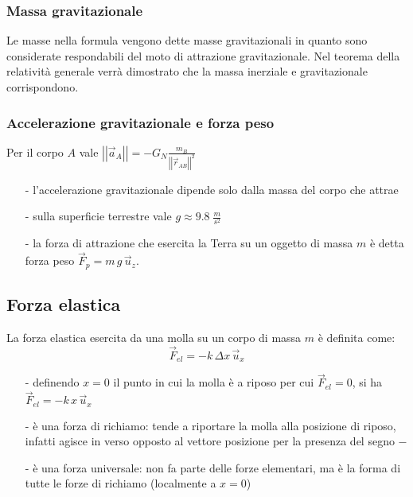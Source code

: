 \documentclass[a4paper]{article}
\newcommand\ux{\vec{u}_x}
\newcommand\uz{\vec{u}_z}
\newcommand\vmod[1]{\left|\left|{#1}\right|\right|}
\begin{document}
\subsubsection*{Massa gravitazionale}
Le masse nella formula vengono dette masse gravitazionali in quanto sono considerate respondabili del moto di attrazione gravitazionale.
Nel teorema della relatività generale verrà dimostrato che la massa inerziale e gravitazionale corrispondono.

\subsubsection*{Accelerazione gravitazionale e forza peso}
Per il corpo \(A\) vale \(\displaystyle \vmod{\vec{a}_A} = -G_N \frac{m_B}{\vmod{\vec{r}_{AB}}^2}\)

\begin{itemize}[topsep=3pt, itemsep=0pt]
	\item[-] l'accelerazione gravitazionale dipende solo dalla massa del corpo che attrae
	\item[-] sulla superficie terrestre vale \(\displaystyle g \approx 9.8 \; \frac{m}{s^2}\)
	\item[-] la forza di attrazione che esercita la Terra su un oggetto di massa \(m\) è detta forza peso \(\vec{F}_p = m \, g \, \uz\).
\end{itemize}

\subsection{Forza elastica}
La forza elastica esercita da una molla su un corpo di massa \(m\) è definita come:
\[\vec{F}_{el} = -k \, \Delta x \, \ux\]
\begin{itemize}[topsep=3pt, itemsep=0pt]
	\item[-] definendo \(x=0\) il punto in cui la molla è a riposo per cui \(\vec{F}_{el} = 0\), si ha \(\vec{F}_{el} = -k \, x \, \ux\)
	\item[-] è una forza di richiamo: tende a riportare la molla alla posizione di riposo, infatti agisce in verso opposto al vettore
	posizione per la presenza del segno \(-\)
	\item[-] è una forza universale: non fa parte delle forze elementari, ma è la forma di tutte le forze di richiamo (localmente a \(x = 0\))
\end{itemize}
\end{document}
